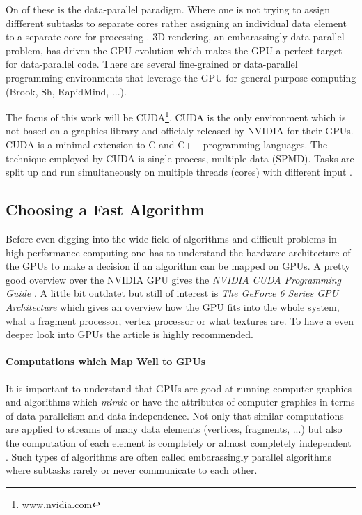 On of these is the data-parallel paradigm. Where one
is not trying to assign diffferent subtasks to separate cores rather assigning
an individual data element to a separate core for processing
\cite{citeulike:3750565}. 3D rendering, an embarassingly data-parallel problem,
has driven the \gls{GPU} evolution which makes the \gls{GPU} a perfect target for
data-parallel code. There are several fine-grained or data-parallel programming
environments that leverage the \gls{GPU} for general purpose computing (Brook, Sh,
RapidMind, ...). 

The focus of this work will be CUDA\footnote{www.nvidia.com}. CUDA is the only
environment which is not based on a graphics library and officialy released by
NVIDIA for their GPUs. CUDA is a minimal extension to C and C++ programming
languages. The technique employed by CUDA is single process, multiple data
(SPMD). Tasks are split up and run simultaneously on multiple threads (cores)
with different input \cite{citeulike:3072519}.

\subsection*{Choosing a Fast Algorithm} %
\label{ssub:choosing_a_fast_algorithm}
Before even digging into the wide field of algorithms and difficult problems in
high performance computing one has to understand the hardware architecture of
the GPUs to make a decision if an algorithm can be mapped on GPUs. A pretty good
overview over the NVIDIA \gls{GPU} gives the \emph{NVIDIA CUDA Programming Guide}
\cite{citeulike:3325943}. A little bit outdatet but still of interest is
\emph{The GeForce 6 Series \gls{GPU} Architecture}\cite{citeulike:3757915} which gives
an overview how the \gls{GPU} fits into the whole system, what a fragment processor,
vertex processor or what textures are. To have a even deeper look into GPUs the
article \cite{citeulike:2790995} is highly recommended.

\paragraph{Computations which Map Well to GPUs} %
\label{par:computations_which_map_well_to_GPUs}
It is important to understand that GPUs are good at running computer graphics
and algorithms which \emph{mimic} or have the attributes of computer graphics in
terms of data parallelism and data independence. Not only that similar
computations are applied to streams of many data elements (vertices, fragments,
...) but also the computation of each element is completely or almost completely
independent \cite{citeulike:3733428}. Such types of algorithms are often called
embarassingly parallel algorithms where subtasks rarely or never communicate to
each other.

